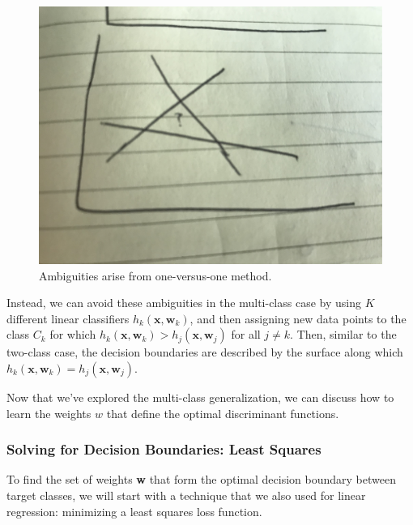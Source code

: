 \begin{figure}
    \centering
    \includegraphics[width=0.5\paperwidth]{../Classification/fig/one_vs_one_ambig.jpg}
    \caption{Ambiguities arise from one-versus-one method.}
    \label{fig:one-vs-one-ambig}
\end{figure}

Instead, we can avoid these ambiguities in the multi-class case by using $K$ different linear classifiers $h_{k}(\textbf{x}, \textbf{w}_{k})$, and then assigning new data points to the class $C_{k}$ for which $h_{k}(\textbf{x}, \textbf{w}_{k}) > h_{j}(\textbf{x}, \textbf{w}_{j})$ for all $j \neq k$. Then, similar to the two-class case, the decision boundaries are described by the surface along which $h_{k}(\textbf{x}, \textbf{w}_{k}) = h_{j}(\textbf{x}, \textbf{w}_{j})$.

Now that we've explored the multi-class generalization, we can discuss how to learn the weights $w$ that define the optimal discriminant functions.

\subsubsection{Solving for Decision Boundaries: Least Squares}
To find the set of weights \textbf{w} that form the optimal decision boundary between target classes, we will start with a technique that we also used for linear regression: minimizing a least squares loss function.

